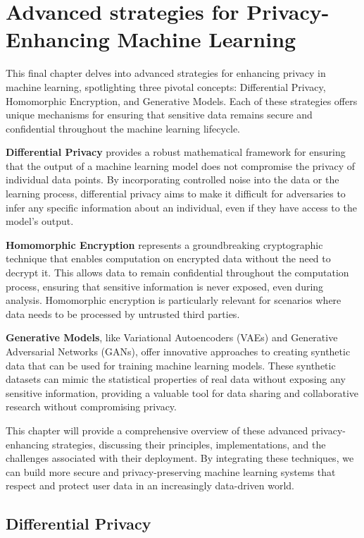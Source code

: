 \chapter{Advanced strategies for Privacy-Enhancing Machine Learning}

This final chapter delves into advanced strategies for enhancing privacy in machine learning, spotlighting three pivotal concepts: Differential Privacy, Homomorphic Encryption, and Generative Models. Each of these strategies offers unique mechanisms for ensuring that sensitive data remains secure and confidential throughout the machine learning lifecycle.

\textbf{Differential Privacy} provides a robust mathematical framework for ensuring that the output of a machine learning model does not compromise the privacy of individual data points. By incorporating controlled noise into the data or the learning process, differential privacy aims to make it difficult for adversaries to infer any specific information about an individual, even if they have access to the model's output.

\textbf{Homomorphic Encryption} represents a groundbreaking cryptographic technique that enables computation on encrypted data without the need to decrypt it. This allows data to remain confidential throughout the computation process, ensuring that sensitive information is never exposed, even during analysis. Homomorphic encryption is particularly relevant for scenarios where data needs to be processed by untrusted third parties.

\textbf{Generative Models}, like Variational Autoencoders (VAEs) and Generative Adversarial Networks (GANs), offer innovative approaches to creating synthetic data that can be used for training machine learning models. These synthetic datasets can mimic the statistical properties of real data without exposing any sensitive information, providing a valuable tool for data sharing and collaborative research without compromising privacy.

This chapter will provide a comprehensive overview of these advanced privacy-enhancing strategies, discussing their principles, implementations, and the challenges associated with their deployment. By integrating these techniques, we can build more secure and privacy-preserving machine learning systems that respect and protect user data in an increasingly data-driven world.

\section{Differential Privacy}


